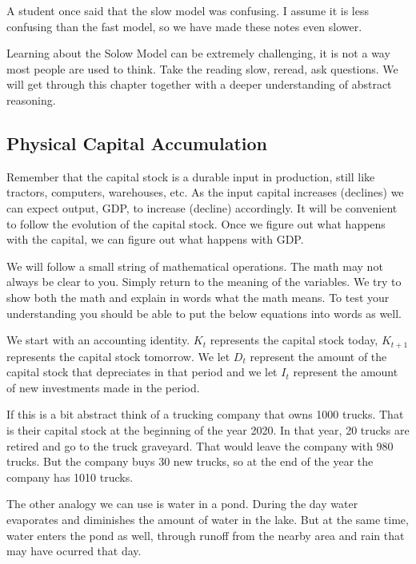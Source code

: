 \documentclass[
]{book}
\begin{document}
A student once said that the slow model was confusing. I assume it is less confusing than the fast model, so we have made these notes even slower.

Learning about the Solow Model can be extremely challenging, it is not a way most people are used to think. Take the reading slow, reread, ask questions. We will get through this chapter together with a deeper understanding of abstract reasoning.

\hypertarget{physical-capital-accumulation}{%
\subsection{Physical Capital Accumulation}\label{physical-capital-accumulation}}

Remember that the capital stock is a durable input in production, still like tractors, computers, warehouses, etc. As the input capital increases (declines) we can expect output, GDP, to increase (decline) accordingly. It will be convenient to follow the evolution of the capital stock. Once we figure out what happens with the capital, we can figure out what happens with GDP.

We will follow a small string of mathematical operations. The math may not always be clear to you. Simply return to the meaning of the variables. We try to show both the math and explain in words what the math means. To test your understanding you should be able to put the below equations into words as well.

We start with an accounting identity. \(K_t\) represents the capital stock today, \(K_{t+1}\) represents the capital stock tomorrow. We let \(D_t\) represent the amount of the capital stock that depreciates in that period and we let \(I_t\) represent the amount of new investments made in the period.

If this is a bit abstract think of a trucking company that owns 1000 trucks. That is their capital stock at the beginning of the year 2020. In that year, 20 trucks are retired and go to the truck graveyard. That would leave the company with 980 trucks. But the company buys 30 new trucks, so at the end of the year the company has 1010 trucks.

The other analogy we can use is water in a pond. During the day water evaporates and diminishes the amount of water in the lake. But at the same time, water enters the pond as well, through runoff from the nearby area and rain that may have ocurred that day.
\end{document}
